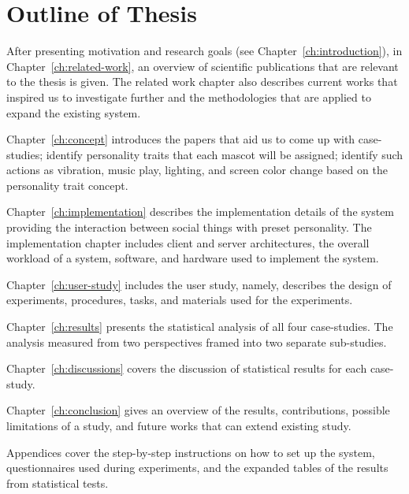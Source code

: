 \section{Outline of Thesis}
\label{sec:outline-of-thesis}
After presenting motivation and research goals (see Chapter~\ref{ch:introduction}), in Chapter~\ref{ch:related-work},
an overview of scientific publications that are relevant to the thesis is given.
The related work chapter also describes current works that inspired us to investigate further
and the methodologies that are applied to expand the existing system.

Chapter~\ref{ch:concept} introduces the papers that aid us to come up with case-studies;
identify personality traits that each mascot will be assigned;
identify such actions as vibration, music play, lighting,
and screen color change based on the personality trait concept.

Chapter~\ref{ch:implementation} describes the implementation details of the system providing the
interaction between social things with preset personality.
The implementation chapter includes client and server architectures,
the overall workload of a system, software, and hardware used to implement the system.

Chapter~\ref{ch:user-study} includes the user study, namely, describes the design of
experiments, procedures, tasks, and materials used for the experiments.

Chapter~\ref{ch:results} presents the statistical analysis of all four case-studies.
The analysis measured from two perspectives framed into two separate sub-studies.

Chapter~\ref{ch:discussions} covers the discussion of statistical results for each case-study.

Chapter~\ref{ch:conclusion} gives an overview of the results, contributions,
possible limitations of a study, and future works that can extend existing study.

Appendices cover the step-by-step instructions on how to set up the system, questionnaires used
during experiments, and the expanded tables of the results from statistical tests.